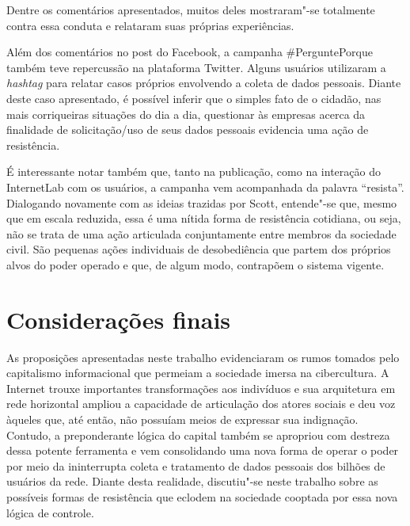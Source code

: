 Dentre os comentários apresentados, muitos deles mostraram"-se totalmente
contra essa conduta e relataram suas próprias experiências. 




Além dos comentários no post do Facebook, a campanha \#PerguntePorque
também teve repercussão na plataforma Twitter. Alguns usuários
utilizaram a \textit{hashtag} para relatar casos próprios envolvendo a
coleta de dados pessoais. Diante deste caso apresentado, é possível
inferir que o simples fato de o cidadão, nas mais corriqueiras situações
do dia a dia, questionar às empresas acerca da finalidade de
solicitação/uso de seus dados pessoais evidencia uma ação de
resistência.

É interessante notar também que, tanto na publicação, como na interação
do InternetLab com os usuários, a campanha vem acompanhada da palavra
``resista''. Dialogando novamente com as ideias trazidas por Scott,
entende"-se que, mesmo que em escala reduzida, essa é uma nítida forma de
resistência cotidiana, ou seja, não se trata de uma ação articulada
conjuntamente entre membros da sociedade civil. São pequenas ações
individuais de desobediência que partem dos próprios alvos do poder
operado e que, de algum modo, contrapõem o sistema vigente.

\section{Considerações finais}

As proposições apresentadas neste trabalho evidenciaram os rumos tomados
pelo capitalismo informacional que permeiam a sociedade imersa na
cibercultura. A Internet trouxe importantes transformações aos
indivíduos e sua arquitetura em rede horizontal ampliou a capacidade de
articulação dos atores sociais e deu voz àqueles que, até então, não
possuíam meios de expressar sua indignação. Contudo, a preponderante
lógica do capital também se apropriou com destreza dessa potente
ferramenta e vem consolidando uma nova forma de operar o poder por meio
da ininterrupta coleta e tratamento de dados pessoais dos bilhões de
usuários da rede. Diante desta realidade, discutiu"-se neste trabalho
sobre as possíveis formas de resistência que eclodem na sociedade
cooptada por essa nova lógica de controle.

